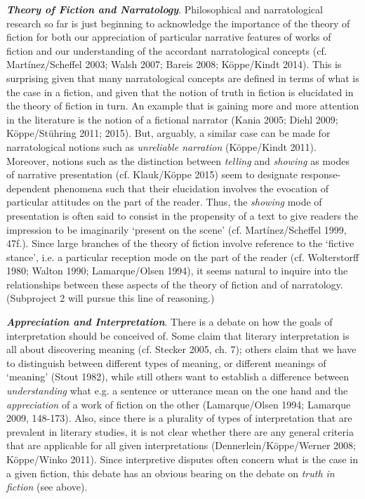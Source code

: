 \vspace{.2cm}
\noindent\textbf{\emph{Theory of Fiction and Narratology}}. Philosophical and narratological research so far is just beginning to acknowledge the importance of the theory of fiction for both our appreciation of particular narrative features of works of fiction and our understanding of the accordant narratological concepts (cf. Mart\'inez/Scheffel 2003; Walsh 2007; Bareis 2008; K\"oppe/Kindt 2014). This is surprising given that many narratological concepts are defined in terms of what is the case in a fiction, and given that the notion of truth in fiction is elucidated in the theory of fiction in turn. An example that is gaining more and more attention in the literature is the notion of a fictional narrator (Kania 2005; Diehl 2009; K\"oppe/St\"uhring 2011; 2015). But, arguably, a similar case can be made for narratological notions such as \emph{unreliable narration} (K\"oppe/Kindt 2011). Moreover, notions such as the distinction between \emph{telling} and \emph{showing} as modes of narrative presentation (cf. Klauk/K\"oppe 2015) seem to designate response-dependent phenomena such that their elucidation involves the evocation of particular attitudes on the part of the reader. Thus, the \emph{showing} mode of presentation is often said to consist in the propensity of a text to give readers the impression to be imaginarily `present on the scene' (cf. Mart\'inez/Scheffel 1999, 47f.). Since large branches of the theory of fiction involve reference to the `fictive stance', i.e. a particular reception mode on the part of the reader (cf. Wolterstorff 1980; Walton 1990; Lamarque/Olsen 1994), it seems natural to inquire into the relationships between these aspects of the theory of fiction and of narratology. (Subproject 2 will pursue this line of reasoning.) 

\vspace{.2cm}
\noindent\textbf{\emph{Appreciation and Interpretation}}. There is a debate on how the goals of interpretation should be conceived of. Some claim that literary interpretation is all about discovering meaning (cf. Stecker 2005, ch. 7); others claim that we have to distinguish between different types of meaning, or different meanings of `meaning' (Stout 1982), while still others want to establish a difference between \emph{understanding} what e.g. a sentence or utterance mean on the one hand and the \emph{appreciation} of a work of fiction on the other (Lamarque/Olsen 1994; Lamarque 2009, 148-173). Also, since there is a plurality of types of interpretation that are prevalent in literary studies, it is not clear whether there are any general criteria that are applicable for all given interpretations (Dennerlein/K\"oppe/Werner 2008; K\"oppe/Winko 2011). Since interpretive disputes often concern what is the case in a given fiction, this debate has an obvious bearing on the debate on \emph{truth in fiction} (see above).
